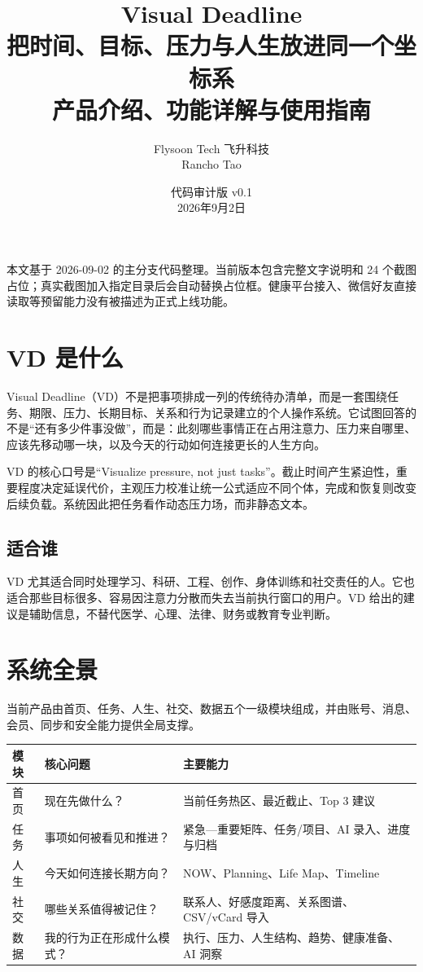 \documentclass[11pt,a4paper,openany]{ctexrep}
\title{\Huge\bfseries Visual Deadline\\[0.6em]\Large 把时间、目标、压力与人生放进同一个坐标系\\[1.2em]\large 产品介绍、功能详解与使用指南}
\author{Flysoon Tech 飞升科技\\Rancho Tao}
\date{代码审计版 v0.1\\2026年9月2日}
\begin{document}
\maketitle

\begin{tcolorbox}[colback=VDLight,colframe=VDPurple,title=文档状态]
本文基于 2026-09-02 的主分支代码整理。当前版本包含完整文字说明和 24 个截图占位；真实截图加入指定目录后会自动替换占位框。健康平台接入、微信好友直接读取等预留能力没有被描述为正式上线功能。
\end{tcolorbox}

\tableofcontents
\clearpage

\chapter{VD 是什么}

Visual Deadline（VD）不是把事项排成一列的传统待办清单，而是一套围绕任务、期限、压力、长期目标、关系和行为记录建立的个人操作系统。它试图回答的不是“还有多少件事没做”，而是：此刻哪些事情正在占用注意力、压力来自哪里、应该先移动哪一块，以及今天的行动如何连接更长的人生方向。

VD 的核心口号是“Visualize pressure, not just tasks”。截止时间产生紧迫性，重要程度决定延误代价，主观压力校准让统一公式适应不同个体，完成和恢复则改变后续负载。系统因此把任务看作动态压力场，而非静态文本。

\section{适合谁}

VD 尤其适合同时处理学习、科研、工程、创作、身体训练和社交责任的人。它也适合那些目标很多、容易因注意力分散而失去当前执行窗口的用户。VD 给出的建议是辅助信息，不替代医学、心理、法律、财务或教育专业判断。

\chapter{系统全景}

当前产品由首页、任务、人生、社交、数据五个一级模块组成，并由账号、消息、会员、同步和安全能力提供全局支撑。

\begin{longtable}{p{2.3cm}p{4.2cm}p{7.0cm}}
\toprule
模块 & 核心问题 & 主要能力 \\
\midrule
首页 & 现在先做什么？ & 当前任务热区、最近截止、Top 3 建议 \\
任务 & 事项如何被看见和推进？ & 紧急—重要矩阵、任务/项目、AI 录入、进度与归档 \\
人生 & 今天如何连接长期方向？ & NOW、Planning、Life Map、Timeline \\
社交 & 哪些关系值得被记住？ & 联系人、好感度距离、关系图谱、CSV/vCard 导入 \\
数据 & 我的行为正在形成什么模式？ & 执行、压力、人生结构、趋势、健康准备、AI 洞察 \\
\bottomrule
\end{longtable}
\end{document}

